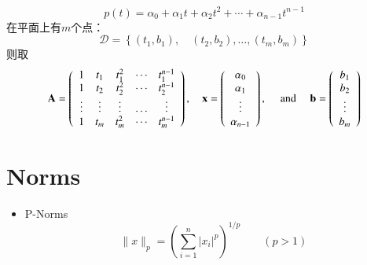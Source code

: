 \documentclass[UTF8,9pt]{ctexart}
\begin{document}
\begin{itemize}
		$$p ( t ) = \alpha _ { 0 } + \alpha _ { 1 } t + \alpha _ { 2 } t ^ { 2 } + \cdots + \alpha _ { n - 1 } t ^ { n - 1 }$$
		在平面上有$m$个点：
		$$\mathcal { D } = \left\{ \left( t _ { 1 } , b _ { 1 } \right) , \quad \left( t _ { 2 } , b _ { 2 } \right) , \ldots , \left( t _ { m } , b _ { m } \right) \right\}$$
		则取
		$$\mathbf { A } = \left( \begin{array} { c c c c c } { 1 } & { t _ { 1 } } & { t _ { 1 } ^ { 2 } } & { \cdots } & { t _ { 1 } ^ { n - 1 } } \\ { 1 } & { t _ { 2 } } & { t _ { 2 } ^ { 2 } } & { \cdots } & { t _ { 2 } ^ { n - 1 } } \\ { \vdots } & { \vdots } & { \vdots } & { \ldots } & { \vdots } \\ { 1 } & { t _ { m } } & { t _ { m } ^ { 2 } } & { \cdots } & { t _ { m } ^ { n - 1 } } \end{array} \right) , \quad \mathbf { x } = \left( \begin{array} { c c } { \alpha _ { 0 } } \\ { \alpha _ { 1 } } \\ { \vdots } \\ { \alpha _ { n - 1 } } \end{array} \right) , \quad \text { and } \quad \mathbf { b } = \left( \begin{array} { c c } { b _ { 1 } } \\ { b _ { 2 } } \\ { \vdots } \\ { b _ { m } } \end{array} \right)$$
\end{itemize}
\section{Norms}
\begin{itemize}
	\item P-Norms
	$$\| x \| _ { p } = \left( \sum _ { i = 1 } ^ { n } \left| x _ { i } \right| ^ { p } \right) ^ { 1 / p }\qquad (p>1)$$
\end{itemize}
\end{document}
